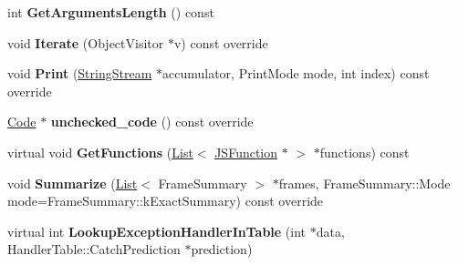 \begin{DoxyCompactItemize}
\item 
int {\bfseries Get\+Arguments\+Length} () const \hypertarget{classv8_1_1internal_1_1_java_script_frame_a3fe52b1b92c6de465a80f20da27f173d}{}\label{classv8_1_1internal_1_1_java_script_frame_a3fe52b1b92c6de465a80f20da27f173d}

\item 
void {\bfseries Iterate} (Object\+Visitor $\ast$v) const  override\hypertarget{classv8_1_1internal_1_1_java_script_frame_a9c2274cd2f79b188d96174795259637e}{}\label{classv8_1_1internal_1_1_java_script_frame_a9c2274cd2f79b188d96174795259637e}

\item 
void {\bfseries Print} (\hyperlink{classv8_1_1internal_1_1_string_stream}{String\+Stream} $\ast$accumulator, Print\+Mode mode, int index) const  override\hypertarget{classv8_1_1internal_1_1_java_script_frame_a510d147d7fd0a8c37a0eeab6c043dad0}{}\label{classv8_1_1internal_1_1_java_script_frame_a510d147d7fd0a8c37a0eeab6c043dad0}

\item 
\hyperlink{classv8_1_1internal_1_1_code}{Code} $\ast$ {\bfseries unchecked\+\_\+code} () const  override\hypertarget{classv8_1_1internal_1_1_java_script_frame_aaf52bbd58a855a6887981b5249bcf55c}{}\label{classv8_1_1internal_1_1_java_script_frame_aaf52bbd58a855a6887981b5249bcf55c}

\item 
virtual void {\bfseries Get\+Functions} (\hyperlink{classv8_1_1internal_1_1_list}{List}$<$ \hyperlink{classv8_1_1internal_1_1_j_s_function}{J\+S\+Function} $\ast$ $>$ $\ast$functions) const \hypertarget{classv8_1_1internal_1_1_java_script_frame_aed5748967e090c39ddbdad9bf36ef83d}{}\label{classv8_1_1internal_1_1_java_script_frame_aed5748967e090c39ddbdad9bf36ef83d}

\item 
void {\bfseries Summarize} (\hyperlink{classv8_1_1internal_1_1_list}{List}$<$ Frame\+Summary $>$ $\ast$frames, Frame\+Summary\+::\+Mode mode=Frame\+Summary\+::k\+Exact\+Summary) const  override\hypertarget{classv8_1_1internal_1_1_java_script_frame_a36943de5276cf4830c8e95d87ea62349}{}\label{classv8_1_1internal_1_1_java_script_frame_a36943de5276cf4830c8e95d87ea62349}

\item 
virtual int {\bfseries Lookup\+Exception\+Handler\+In\+Table} (int $\ast$data, Handler\+Table\+::\+Catch\+Prediction $\ast$prediction)\hypertarget{classv8_1_1internal_1_1_java_script_frame_ac4cbe476e95a9f4704e464f30406e23d}{}\label{classv8_1_1internal_1_1_java_script_frame_ac4cbe476e95a9f4704e464f30406e23d}

\end{DoxyCompactItemize}
